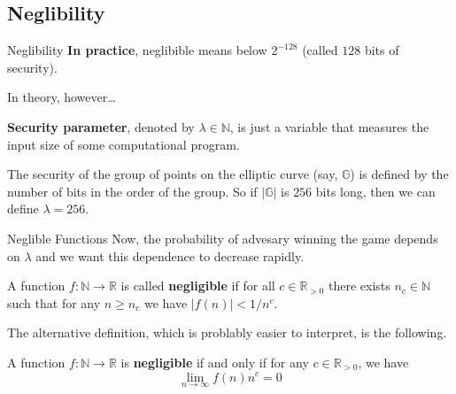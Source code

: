 \documentclass{beamer}
\begin{document}
    \subsection{Neglibility}

    \begin{frame}{Neglibility}
        \textbf{In practice}, neglibible means below $2^{-128}$ (called $128$ bits of security).

        In theory, however\ldots

        \begin{definition}
            \textbf{Security parameter}, denoted by $\lambda \in \mathbb{N}$, is just a variable that measures the input size of some computational program.
        \end{definition}

        \begin{example}
            The security of the group of points on the elliptic curve (say, $\mathbb{G}$) is defined by the number of bits in the order of the group. So if $|\mathbb{G}|$ is $256$ bits long, then we can define $\lambda = 256$.
        \end{example}
    \end{frame}

    \begin{frame}{Neglible Functions}
        Now, the probability of advesary winning the game depends on $\lambda$ and we want this dependence to decrease rapidly.

        \begin{definition}
            A function $f: \mathbb{N} \to \mathbb{R}$ is called \textbf{negligible} if for all $c \in \mathbb{R}_{>0}$ there exists $n_c \in \mathbb{N}$ such that for any $n \geq n_c$ we have $|f(n)| < 1/n^c$.
        \end{definition}
        
        The alternative definition, which is problably easier to interpret, is the following.
        
        \begin{theorem}
            A function $f: \mathbb{N} \to \mathbb{R}$ is \textbf{negligible} if and only if for any $c \in \mathbb{R}_{>0}$, we have
            \begin{equation*}
                \lim_{n \to \infty} f(n)n^c = 0
            \end{equation*}
        \end{theorem}
    \end{frame}
\end{document}
